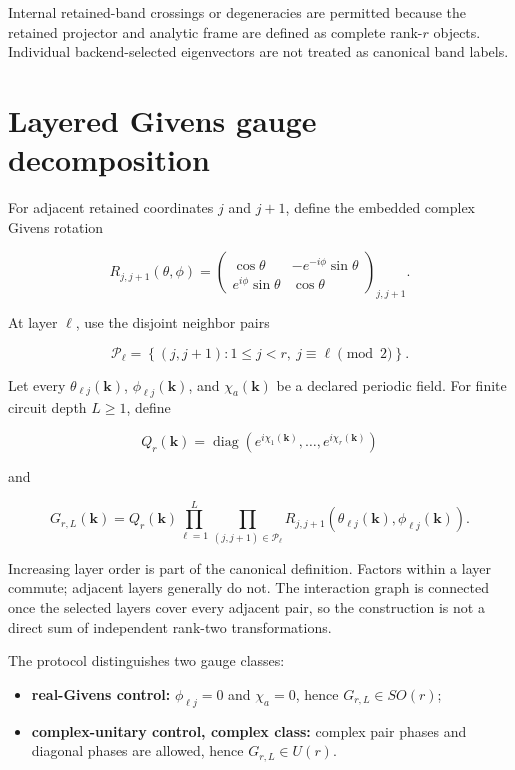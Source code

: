 \documentclass[11pt]{article}
\begin{document}
Internal retained-band crossings or degeneracies are permitted because the retained
projector and analytic frame are defined as complete rank-$r$ objects. Individual
backend-selected eigenvectors are not treated as canonical band labels.

\section{Layered Givens gauge decomposition}

For adjacent retained coordinates $j$ and $j+1$, define the embedded complex Givens
rotation

\[
R_{j,j+1}(\theta,\phi)=
\begin{pmatrix}
\cos\theta&-e^{-i\phi}\sin\theta\\
e^{i\phi}\sin\theta&\cos\theta
\end{pmatrix}_{j,j+1}.
\]

At layer $\ell$, use the disjoint neighbor pairs

\[
\mathcal P_\ell=
\left\{(j,j+1):1\leq j<r,\ j\equiv\ell\pmod 2\right\}.
\]

Let every $\theta_{\ell j}(\mathbf k)$, $\phi_{\ell j}(\mathbf k)$, and
$\chi_a(\mathbf k)$ be a declared periodic field. For finite circuit depth $L\geq1$,
define

\[
Q_r(\mathbf k)=\operatorname{diag}
\left(e^{i\chi_1(\mathbf k)},\ldots,e^{i\chi_r(\mathbf k)}\right)
\]

and

\[
G_{r,L}(\mathbf k)=Q_r(\mathbf k)
\prod_{\ell=1}^{L}
\prod_{(j,j+1)\in\mathcal P_\ell}
R_{j,j+1}\!\left(
\theta_{\ell j}(\mathbf k),\phi_{\ell j}(\mathbf k)
\right).
\]

Increasing layer order is part of the canonical definition. Factors within a layer
commute; adjacent layers generally do not. The interaction graph is connected once the
selected layers cover every adjacent pair, so the construction is not a direct sum of
independent rank-two transformations.

The protocol distinguishes two gauge classes:

\begin{itemize}
\item \textbf{real-Givens control:} $\phi_{\ell j}=0$ and $\chi_a=0$, hence
$G_{r,L}\in SO(r)$;
\item \textbf{complex-unitary control, complex class:} complex pair phases and diagonal phases are allowed, hence
$G_{r,L}\in U(r)$.
\end{itemize}
\end{document}
